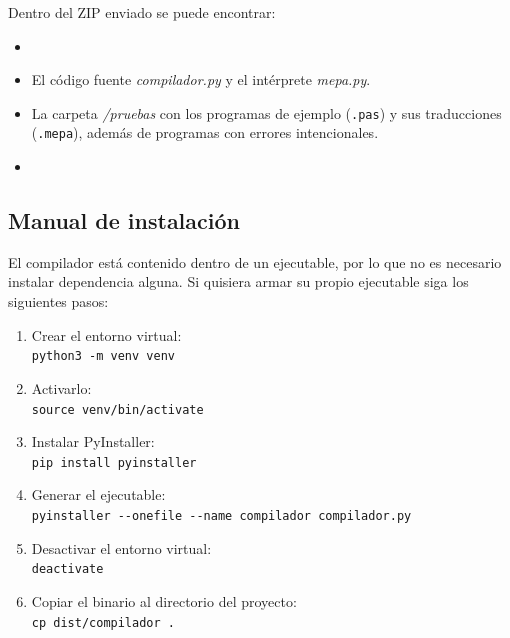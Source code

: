 \documentclass[12pt]{article}
\begin{document}

Dentro del ZIP enviado se puede encontrar:

\begin{itemize}
    \item {}
    \item El código fuente \textit{compilador.py} y el intérprete \textit{mepa.py}.
    \item La carpeta \textit{/pruebas} con los programas de ejemplo (\texttt{.pas}) y sus traducciones (\texttt{.mepa}), además de programas con errores intencionales.
    \item {}
\end{itemize}

\subsection{Manual de instalación}

El compilador está contenido dentro de un ejecutable, por lo que no es necesario instalar dependencia alguna. Si quisiera armar su propio ejecutable siga los siguientes pasos:

\begin{enumerate}
    \item Crear el entorno virtual:\\
    \verb|python3 -m venv venv|
    \item Activarlo:\\
    \verb|source venv/bin/activate|
    \item Instalar PyInstaller:\\
    \verb|pip install pyinstaller|
    \item Generar el ejecutable:\\
    \verb|pyinstaller --onefile --name compilador compilador.py|
    \item Desactivar el entorno virtual:\\
    \verb|deactivate|
    \item Copiar el binario al directorio del proyecto:\\
    \verb|cp dist/compilador .|
\end{enumerate}
\end{document}
